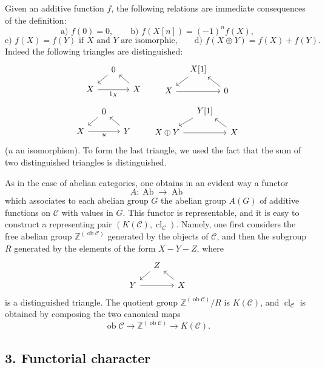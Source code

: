 \documentclass[11pt]{article}
\providecommand{\Ob}{\operatorname{ob}}
\providecommand{\cC}{\mathcal C}
\providecommand{\Ob}{\operatorname{ob}}
\providecommand{\Ab}{\operatorname{Ab}}
\providecommand{\cC}{\mathcal C}
\providecommand{\Ab}{\operatorname{Ab}}
\providecommand{\Ob}{\operatorname{Ob}}
\begin{document}
Given an additive function $f$, the following relations are immediate consequences of the definition:
\[
\text{a) } f(0)=0,\qquad
\text{b) } f(X[n])=(-1)^n f(X),
\]
\[
\text{c) } f(X)=f(Y)\text{ if }X\text{ and }Y\text{ are isomorphic,}
\qquad
\text{d) } f(X\oplus Y)=f(X)+f(Y).
\]
Indeed the following triangles are distinguished:
\[
\begin{tikzcd}[column sep=small,row sep=small]
&0 \arrow[dl]\\ X \arrow[rr,"1_X"']&&X\arrow[ul]
\end{tikzcd}
\qquad
\begin{tikzcd}[column sep=small,row sep=small]
&X[1]\arrow[dl]\\ X\arrow[rr]&&0\arrow[ul]
\end{tikzcd}
\]
\[
\begin{tikzcd}[column sep=small,row sep=small]
&0\arrow[dl]\\ X\arrow[rr,"u"']&&Y\arrow[ul]
\end{tikzcd}
\qquad
\begin{tikzcd}[column sep=small,row sep=small]
&Y[1]\arrow[dl]\\ X\oplus Y\arrow[rr]&&X\arrow[ul]
\end{tikzcd}
\]
($u$ an isomorphism). To form the last triangle, we used the fact that the sum of two distinguished triangles is distinguished.

As in the case of abelian categories, one obtains in an evident way a functor
\[
A:\Ab\longrightarrow\Ab
\]
which associates to each abelian group $G$ the abelian group $A(G)$ of additive functions on $\cC$ with values in $G$. This functor is representable, and it is easy to construct a representing pair $(K(\cC),\operatorname{cl}_{\cC})$. Namely, one first considers the free abelian group $\mathbb Z^{(\Ob\cC)}$ generated by the objects of $\cC$, and then the subgroup $R$ generated by the elements of the form $X-Y-Z$, where
\[
\begin{tikzcd}[column sep=small,row sep=small]
&Z\arrow[dl]\\ Y\arrow[rr]&&X\arrow[ul]
\end{tikzcd}
\]
is a distinguished triangle. The quotient group $\mathbb Z^{(\Ob\cC)}/R$ is $K(\cC)$, and $\operatorname{cl}_{\cC}$ is obtained by composing the two canonical maps
\[
\Ob\cC\longrightarrow \mathbb Z^{(\Ob\cC)}\longrightarrow K(\cC).
\]

\subsection*{3. Functorial character}
\end{document}

